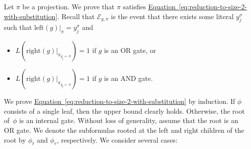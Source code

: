 \documentclass[11pt]{article}
\numberwithin{equation}{section}
\theoremstyle{definition}
\theoremstyle{plain}
\newcommand{\expref}[2]{\hyperref[#2]{#1~\ref{#2}}}
\theoremstyle{definition}\newtheorem{notation}[theorem]{Notation}\theoremstyle{plain}
\newcommand{\cE}{\mathcal{E}}
\newcommand{\lc}{\mathrm{left}}
\newcommand{\rc}{\mathrm{right}}
\theoremstyle{definition}
\theoremstyle{plain}
\begin{document}
Let $\pi$ be a projection. We prove that $\pi$ satisfies \expref{Equation}{eq:reduction-to-size-2-with-substitution}.
Recall that $\cE_{g,\pi}$ is the event that there exists some literal
$y_{j}^{\sigma}$ such that $\lc(g)|_{\pi}=y_{j}^{\sigma}$ and
\begin{itemize}
\item $L(\rc(g)|_{\pi_{y_{j}\gets\sigma}})=1$ if $g$ is an OR gate, or 
\item $L(\rc(g)|_{\pi_{y_{j}\gets\overline{\sigma}}})=1$ if $g$ is an
AND gate. 
\end{itemize}
We prove \expref{Equation}{eq:reduction-to-size-2-with-substitution} by induction.
If $\phi$ consists of a single leaf, then the upper bound clearly
holds. Otherwise, the root of~$\phi$ is an internal gate. Without
loss of generality, assume that the root is an OR gate. We denote
the %
subformulas  %
rooted at the left and right children of the root
by $\phi_{\ell}$ and $\phi_{r}$, respectively. We consider several
cases: 
\end{document}

